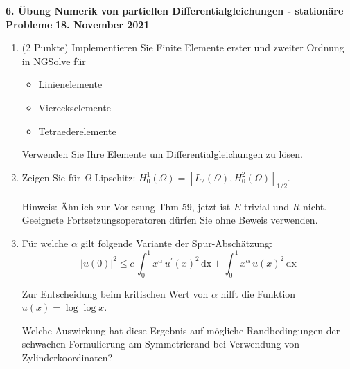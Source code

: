 \documentclass[11pt,a4paper]{report}
\begin{document}
\begin{center}
\textbf{6. \"Ubung Numerik von partiellen Differentialgleichungen - station\"are Probleme} \newline 
\textbf{18. November 2021}
\end{center}

\setcounter{enumi}{4}

\begin{enumerate}

\item (2 Punkte) Implementieren Sie Finite Elemente erster und zweiter
  Ordnung in NGSolve f\"ur 
  \begin{itemize}
  \item Linienelemente
  \item Viereckselemente
  \item Tetraederelemente
  \end{itemize}

Verwenden Sie Ihre Elemente um Differentialgleichungen zu l\"osen.
  
\item Zeigen Sie f\"ur $\Omega$ Lipschitz: $H_0^1(\Omega) = [L_2(\Omega),
H_0^2(\Omega)]_{1/2}$.

Hinweis: \"Ahnlich zur Vorlesung Thm 59, jetzt ist $E$ trivial und $R$
nicht. Geeignete Fortsetzungsoperatoren d\"urfen Sie ohne Beweis verwenden. 

\item F\"ur welche $\alpha$ gilt folgende Variante der Spur-Absch\"atzung:
$$
|u(0)|^2 \leq c \, \int_0^1 x^\alpha \, u^\prime(x)^2 \, \text{dx} + \int_0^1
x^\alpha \, u(x)^2 \, \text{dx}
$$

Zur Entscheidung beim kritischen Wert von $\alpha$ hilft die Funktion
$u(x) = \log \log x$.

Welche Auswirkung hat diese Ergebnis auf m\"ogliche Randbedingungen der schwachen Formulierung
am Symmetrierand bei Verwendung von Zylinderkoordinaten?


\end{enumerate}
\end{document}
